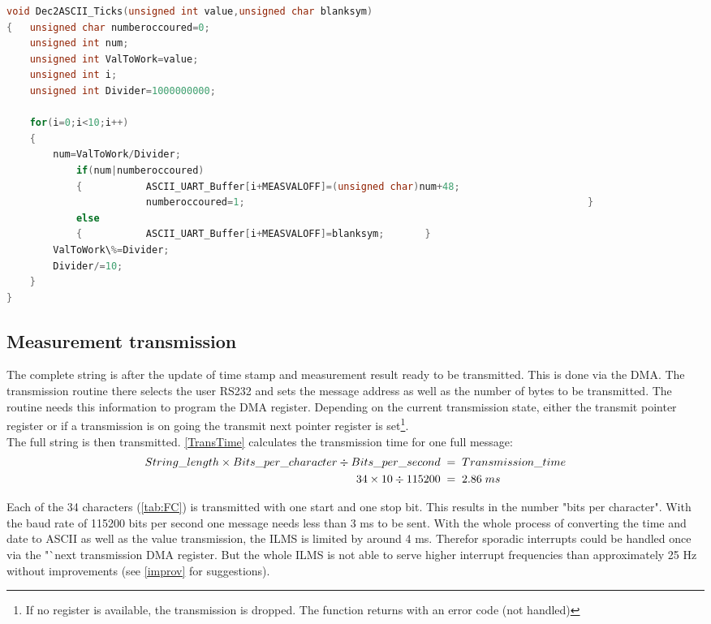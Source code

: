  
\begin{lstlisting}[language=C,caption={Result to ASCII conversion},label={Res2ASCII}]
void Dec2ASCII_Ticks(unsigned int value,unsigned char blanksym)
{	unsigned char numberoccoured=0;
	unsigned int num;
	unsigned int ValToWork=value;
	unsigned int i;
	unsigned int Divider=1000000000;
	
	for(i=0;i<10;i++)
	{	
		num=ValToWork/Divider;
			if(num|numberoccoured)
			{			ASCII_UART_Buffer[i+MEASVALOFF]=(unsigned char)num+48;
						numberoccoured=1;															}
			else
			{			ASCII_UART_Buffer[i+MEASVALOFF]=blanksym; 		}
		ValToWork\%=Divider;
		Divider/=10;
	}
}
\end{lstlisting}








\subsection{Measurement transmission}
The complete string is after the update of time stamp and measurement result ready to be transmitted. This is done via the \ac{DMA}. The transmission routine there selects the user RS232 and sets the message address as well as the number of bytes to be transmitted. The routine needs this information to program the \ac{DMA} register. Depending on the current transmission state, either the transmit pointer register or if a transmission is on going the transmit next pointer register is set\footnote{If no register is available, the transmission is dropped. The function returns with an error code (not handled)}.\\
The full string is then transmitted. \autoref{TransTime} calculates the transmission time for one full message: 
\begin{align}
String\_length \times Bits\_per\_character \div	Bits\_per\_second\;&=\;  Transmission\_time\notag\\ 
34 \times 10 \div 115200\;&=\;2.86\;ms
\label{TransTime}
\end{align}

Each of the 34 characters (\autoref{tab:FC}) is transmitted with one start and one stop bit. This results in the number "bits per character". With the baud rate of 115200 bits per second one message needs less than 3 ms to be sent. 
With the whole process of converting the time and date to ASCII as well as the value transmission, the \ac{ILMS} is limited by around 4 ms. Therefor sporadic interrupts could be handled once via the "`next transmission \ac{DMA} register. But the whole \ac{ILMS} is not able to serve higher interrupt frequencies than approximately 25 Hz without improvements (see \autoref{improv} for suggestions).



